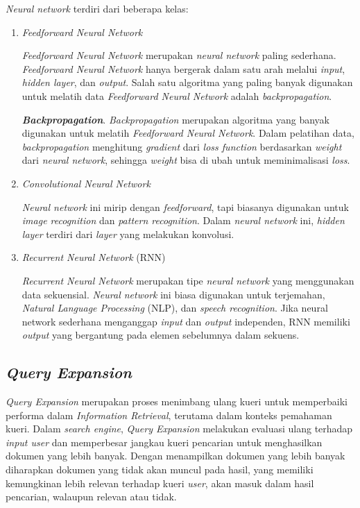 \documentclass[12pt]{report}
\begin{document}
\textit{Neural network} terdiri dari beberapa kelas:
\begin{enumerate}
\item \textit{Feedforward Neural Network}


\textit{Feedforward Neural Network} merupakan \textit{neural network} paling sederhana. \textit{Feedforward Neural Network} hanya bergerak dalam satu arah melalui \textit{input}, \textit{hidden layer}, dan \textit{output}. Salah satu algoritma yang paling banyak digunakan untuk melatih data \textit{Feedforward Neural Network} adalah \textit{backpropagation}.


{\bfseries\textit{Backpropagation}}. \textit{Backpropagation} merupakan algoritma yang banyak digunakan untuk melatih \textit{Feedforward Neural Network}. Dalam pelatihan data, \textit{backpropagation} menghitung \textit{gradient} dari \textit{loss function} berdasarkan \textit{weight} dari \textit{neural network}, sehingga \textit{weight} bisa di ubah untuk meminimalisasi \textit{loss}.

\item \textit{Convolutional Neural Network}


\textit{Neural network} ini mirip dengan \textit{feedforward}, tapi biasanya digunakan untuk \textit{image recognition} dan \textit{pattern recognition}. Dalam \textit{neural network} ini, \textit{hidden layer} terdiri dari \textit{layer} yang melakukan konvolusi.

\item \textit{Recurrent Neural Network} (RNN)


\textit{Recurrent Neural Network} merupakan tipe \textit{neural network} yang menggunakan data sekuensial. \textit{Neural network} ini biasa digunakan untuk terjemahan, \textit{Natural Language Processing} (NLP), dan \textit{speech recognition}. Jika neural network sederhana menganggap \textit{input} dan \textit{output} independen, RNN memiliki \textit{output} yang bergantung pada elemen sebelumnya dalam sekuens.
\end{enumerate}

\subsection{\textit{Query Expansion}}
\textit{Query Expansion} merupakan proses menimbang ulang kueri untuk memperbaiki performa dalam \textit{Information Retrieval}, terutama dalam konteks pemahaman kueri. Dalam \textit{search engine}, \textit{Query Expansion} melakukan evaluasi ulang terhadap \textit{input user} dan memperbesar jangkau kueri pencarian untuk menghasilkan dokumen yang lebih banyak. Dengan menampilkan dokumen yang lebih banyak diharapkan dokumen yang tidak akan muncul pada hasil, yang memiliki kemungkinan lebih relevan terhadap kueri \textit{user}, akan masuk dalam hasil pencarian, walaupun relevan atau tidak.
\end{document}
